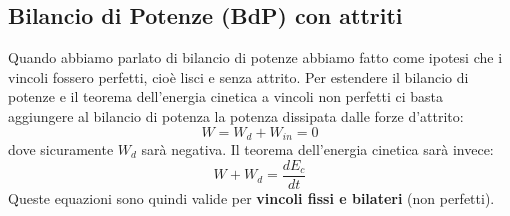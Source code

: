 \subsection{Bilancio di Potenze (BdP) con attriti}
Quando abbiamo parlato di bilancio di potenze abbiamo fatto come ipotesi che i vincoli fossero perfetti, cioè lisci e senza attrito.\newline
\newline
Per estendere il bilancio di potenze e il teorema dell'energia cinetica a vincoli non perfetti ci basta aggiungere al bilancio di potenza la potenza dissipata dalle forze d'attrito:
\[
    W = W_d + W_{in} = 0
\]
dove sicuramente $W_d$ sarà negativa.\newline
Il teorema dell'energia cinetica sarà invece:
\[
    W + W_d = \frac{dE_c}{dt}
\]
Queste equazioni sono quindi valide per \textbf{vincoli fissi e bilateri} (non perfetti).
